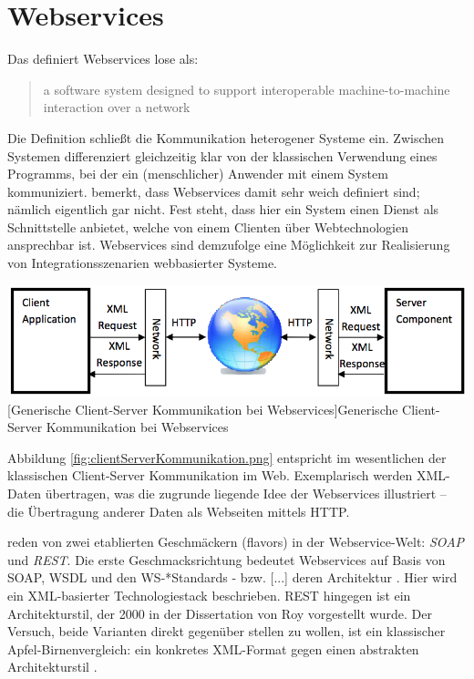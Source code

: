\documentclass[11pt, a4paper, titlepage, listof=totoc, bibliography=totoc, index=totoc, twoside, openright, headings=normal]{scrreprt}
\begin{document}
\section{Webservices}
\label{Webservices}

Das \citet	{w3c04} definiert Webservices lose als:

\begin{quote}
\glqq [...] a software system designed to support interoperable machine-to-machine interaction over a network\grqq
\end{quote}

Die Definition schließt die Kommunikation heterogener Systeme ein. \glqq Zwischen Systemen\grqq{} differenziert gleichzeitig klar von der klassischen Verwendung eines Programms, bei der ein (menschlicher) Anwender mit einem System kommuniziert. \citet{tilkov11} bemerkt, dass Webservices damit sehr weich definiert sind; \glqq nämlich eigentlich gar nicht\grqq{}. Fest steht, dass hier ein System einen Dienst als Schnittstelle anbietet, welche von einem Clienten über Webtechnologien ansprechbar ist. Webservices sind demzufolge eine Möglichkeit zur Realisierung von Integrationsszenarien webbasierter Systeme.

\vspace{1em}
\begin{minipage}{\linewidth}
	\centering
	\includegraphics[width=0.7\linewidth]{Abbildungen/clientServerKommunikation.png}
	[Generische Client-Server Kommunikation bei Webservices]{Generische Client-Server Kommunikation bei Webservices}
	\label{fig:clientServerKommunikation.png}
\end{minipage}
\vspace{1em}

Abbildung \ref{fig:clientServerKommunikation.png} entspricht im wesentlichen der klassischen Client-Server Kommunikation im Web. Exemplarisch werden XML-Daten übertragen, was die zugrunde liegende Idee der Webservices illustriert -- die Übertragung anderer Daten als Webseiten mittels HTTP.

\citet{wilde11} reden von zwei etablierten \glqq Geschmäckern\grqq{} (flavors) in der Webservice-Welt: \emph{SOAP} und \emph{REST}. Die erste Geschmacksrichtung bedeutet Webservices \glqq auf Basis von SOAP, WSDL und den WS-*Standards - bzw. [...] deren Architektur\grqq{} \citep{tilkov11}. Hier wird ein XML-basierter Technologiestack beschrieben. REST hingegen ist ein Architekturstil, der 2000 in der Dissertation von Roy \citeauthor{fielding00} vorgestellt wurde. Der Versuch, beide Varianten direkt gegenüber stellen zu wollen, ist ein \glqq [...] klassischer Apfel-Birnenvergleich: ein konkretes XML-Format gegen einen abstrakten Architekturstil\grqq{} \citep{tilkov11}.
\end{document}
